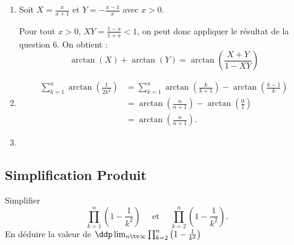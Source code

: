 \begin{correction}
\begin{enumerate}
\item Soit $X= \frac{x}{x+1}$ et $Y=-\frac{x-1}{x}$ avec $x>0$. 

Pour tout $x>0$, $XY = \frac{1-x}{1+x}<1$, on peut donc appliquer le résultat de la question 6. On obtient : 
$$\arctan(X)+\arctan(Y) =\arctan\left(\frac{X+Y}{1-XY}\right)$$




\item \begin{align*}
\sum_{k=1}^n \arctan\left(\frac{1}{2k^2}\right)&=\sum_{k=1}^n  \arctan\left(\frac{k}{k+1}\right)-\arctan\left(\frac{k-1}{k}\right)\\
&=\arctan(\frac{n}{n+1}) - \arctan(\frac{0}{1})\\
&=\arctan(\frac{n}{n+1}).
\end{align*}

\item {}
\end{enumerate}




\end{correction}





\subsection{Simplification Produit}

\begin{exercice}
Simplifier  
$$\prod_{k=1}^n \left(1-\frac{1}{k^2}\right) \quad \text{ et } \quad \prod_{k=2}^n \left(1-\frac{1}{k^2}\right).$$
En déduire la valeur de $\ddp \lim_{n\tv \infty} \prod_{k=2}^n \left(1-\frac{1}{k^2}\right)$
\end{exercice}




